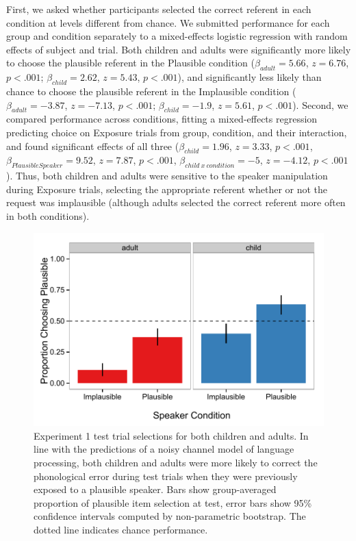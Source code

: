 \documentclass[man,floatsintext]{apa6}
\begin{document}
First, we asked whether participants selected the correct referent in each condition at levels different from chance. We submitted performance for each group and condition separately to a mixed-effects logistic regression with random effects of subject and trial. Both children and adults were significantly more likely to choose the plausible referent in the Plausible condition ($\beta_{adult} = 5.66$, $z = 6.76$, $p <.001$; $\beta_{child} = 2.62$, $z = 5.43$, $p <.001$), and significantly less likely than chance to choose the plausible referent in the Implausible condition ($\beta_{adult} = -3.87$, $z = -7.13$, $p <.001$; $\beta_{child} = -1.9$, $z = 5.61$, $p <.001$). Second, we compared performance across conditions, fitting a mixed-effects regression predicting choice on Exposure trials from group, condition, and their interaction, and found significant effects of all three ($\beta_{child} = 1.96$,  $z = 3.33$, $p <.001$, $\beta_{Plausible Speaker} = 9.52$,  $z = 7.87$, $p <.001$,  $\beta_{child\: x \: condition} = -5$,  $z = -4.12$, $p <.001$). Thus, both children and adults were sensitive to the speaker manipulation during Exposure trials, selecting the appropriate referent whether or not the request was implausible (although adults selected the correct referent more often in both conditions).

\begin{figure}[t]
\centering
     \includegraphics[width=5in]{figures/exp1_results.pdf}
    \caption{Experiment 1 test trial selections for both children and adults. In line with the predictions of a noisy channel model of language processing, both children and adults were more likely to correct the phonological error during test trials when they were previously exposed to a plausible speaker. Bars show group-averaged proportion of plausible item selection at test, error bars show 95\% confidence intervals computed by non-parametric bootstrap. The dotted line indicates chance performance.}%
   \label{fig:exp1_results}
\end{figure}
\end{document}
